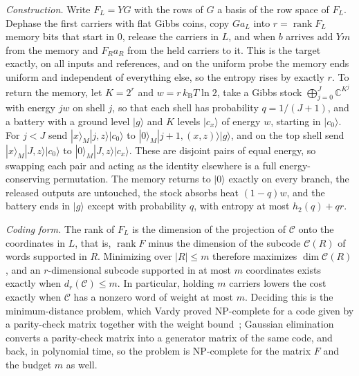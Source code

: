 \documentclass[11pt]{article}
\theoremstyle{definition}
\theoremstyle{remark}
\newcommand{\kB}{k_{\mathrm B}}
\begin{document}
\emph{Construction.} Write $F_L=YG$ with the rows of $G$ a basis of the row space of $F_L$. Dephase the first carriers with flat Gibbs coins, copy $Ga_L$ into $r=\operatorname{rank}F_L$ memory bits that start in $0$, release the carriers in $L$, and when $b$ arrives add $Ym$ from the memory and $F_Ra_R$ from the held carriers to it. This is the target exactly, on all inputs and references, and on the uniform probe the memory ends uniform and independent of everything else, so the entropy rises by exactly $r$. To return the memory, let $K=2^r$ and $w=r\,\kB T\ln2$, take a Gibbs stock $\bigoplus_{j=0}^J\mathbb C^{K^j}$ with energy $jw$ on shell $j$, so that each shell has probability $q=1/(J+1)$, and a battery with a ground level $|g\rangle$ and $K$ levels $|c_x\rangle$ of energy $w$, starting in $|c_0\rangle$. For $j<J$ send $|x\rangle_M|j,z\rangle|c_0\rangle$ to $|0\rangle_M|j+1,(x,z)\rangle|g\rangle$, and on the top shell send $|x\rangle_M|J,z\rangle|c_0\rangle$ to $|0\rangle_M|J,z\rangle|c_x\rangle$. These are disjoint pairs of equal energy, so swapping each pair and acting as the identity elsewhere is a full energy-conserving permutation. The memory returns to $|0\rangle$ exactly on every branch, the released outputs are untouched, the stock absorbs heat $(1-q)w$, and the battery ends in $|g\rangle$ except with probability $q$, with entropy at most $h_2(q)+qr$.

\emph{Coding form.} The rank of $F_L$ is the dimension of the projection of $\mathcal C$ onto the coordinates in $L$, that is, $\operatorname{rank}F$ minus the dimension of the subcode $\mathcal C(R)$ of words supported in $R$. Minimizing over $|R|\le m$ therefore maximizes $\dim\mathcal C(R)$, and an $r$-dimensional subcode supported in at most $m$ coordinates exists exactly when $d_r(\mathcal C)\le m$. In particular, holding $m$ carriers lowers the cost exactly when $\mathcal C$ has a nonzero word of weight at most $m$. Deciding this is the minimum-distance problem, which Vardy proved NP-complete for a code given by a parity-check matrix together with the weight bound~\cite{Vardy97}; Gaussian elimination converts a parity-check matrix into a generator matrix of the same code, and back, in polynomial time, so the problem is NP-complete for the matrix $F$ and the budget $m$ as well.
\end{document}
